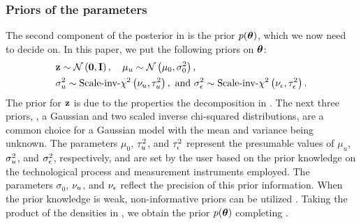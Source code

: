 \subsubsection{Priors of the parameters}
The second component of the posterior in  is the prior $\f{\vparam}$, which we now need to decide on.
In this paper, we put the following priors on ${\boldsymbol\theta}$:
\begin{align}
  & \vz \sim \gaussian{\vZero}{\mOne}, \hspace{1em} \mu_\u \sim \gaussian{\mu_0}{\sigma^2_0}, \elabel{priors} \\
  & \sigma^2_\u \sim \sichisquared{\nu_\u}{\tau^2_\u}, \text{ and } \sigma^2_\noise \sim \sichisquared{\nu_\noise}{\tau^2_\noise}. \nonumber
\end{align}
The prior for $\mathbf{z}$ is due to the properties the decomposition in .
The next three priors, \ie, a Gaussian and two scaled inverse chi-squared distributions, are a common choice for a Gaussian model with the mean and variance being unknown.
The parameters $\mu_0$, $\tau^2_u$, and $\tau^2_\epsilon$ represent the presumable values of $\mu_u$, $\sigma^2_u$, and $\sigma^2_\epsilon$, respectively, and are set by the user based on the prior knowledge on the technological process and measurement instruments employed. The parameters $\sigma_0$, $\nu_u$, and $\nu_\epsilon$ reflect the precision of this prior information.
When the prior knowledge is weak, non-informative priors can be utilized \cite{gelman2004}.
Taking the product of the densities in , we obtain the prior $\f{\vparam}$ completing .

